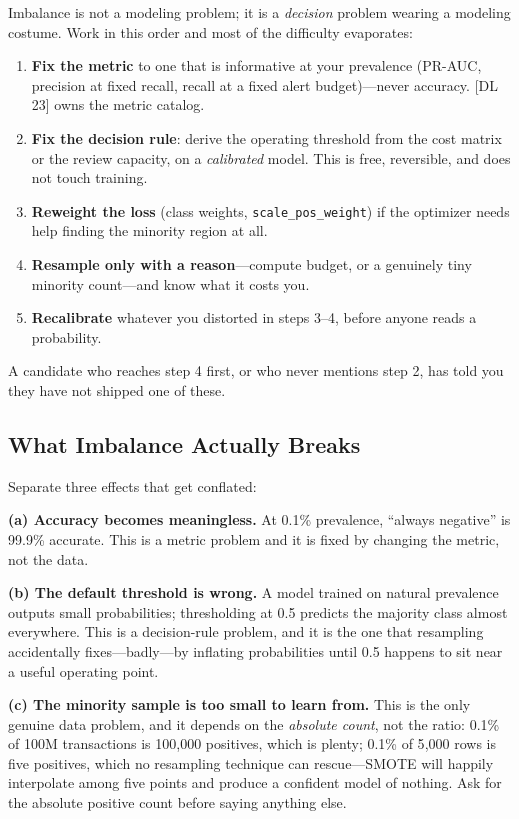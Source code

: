 \begin{keyinsight}
Imbalance is not a modeling problem; it is a \emph{decision} problem wearing a modeling costume. Work in this order and most of the difficulty evaporates:
\begin{enumerate}
    \item \textbf{Fix the metric} to one that is informative at your prevalence (PR-AUC, precision at fixed recall, recall at a fixed alert budget)---never accuracy. [DL 23] owns the metric catalog.
    \item \textbf{Fix the decision rule}: derive the operating threshold from the cost matrix or the review capacity, on a \emph{calibrated} model. This is free, reversible, and does not touch training.
    \item \textbf{Reweight the loss} (class weights, \texttt{scale\_pos\_weight}) if the optimizer needs help finding the minority region at all.
    \item \textbf{Resample only with a reason}---compute budget, or a genuinely tiny minority count---and know what it costs you.
    \item \textbf{Recalibrate} whatever you distorted in steps 3--4, before anyone reads a probability.
\end{enumerate}
A candidate who reaches step 4 first, or who never mentions step 2, has told you they have not shipped one of these.
\end{keyinsight}

\subsection{What Imbalance Actually Breaks}

Separate three effects that get conflated:

\textbf{(a) Accuracy becomes meaningless.} At 0.1\% prevalence, ``always negative'' is 99.9\% accurate. This is a metric problem and it is fixed by changing the metric, not the data.

\textbf{(b) The default threshold is wrong.} A model trained on natural prevalence outputs small probabilities; thresholding at 0.5 predicts the majority class almost everywhere. This is a decision-rule problem, and it is the one that resampling accidentally fixes---badly---by inflating probabilities until 0.5 happens to sit near a useful operating point.

\textbf{(c) The minority sample is too small to learn from.} This is the only genuine data problem, and it depends on the \emph{absolute count}, not the ratio: 0.1\% of 100M transactions is 100{,}000 positives, which is plenty; 0.1\% of 5{,}000 rows is five positives, which no resampling technique can rescue---SMOTE will happily interpolate among five points and produce a confident model of nothing. Ask for the absolute positive count before saying anything else.


